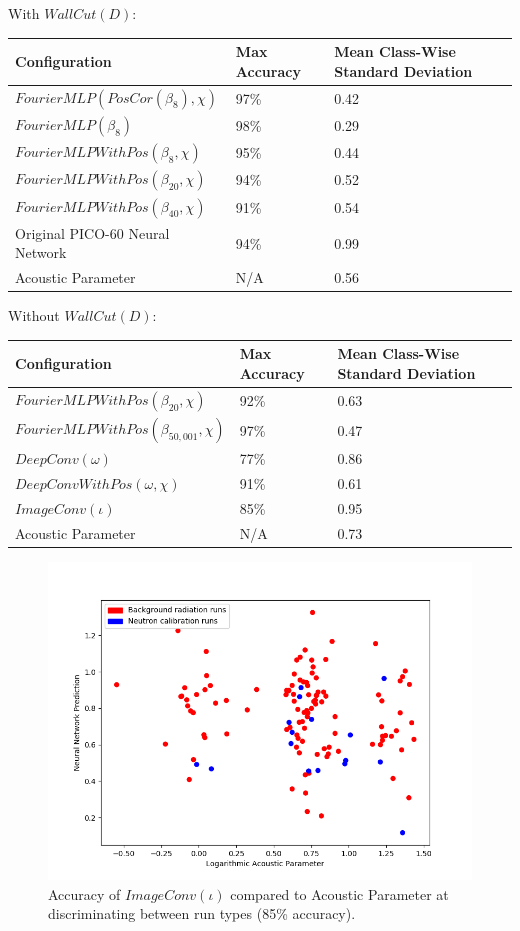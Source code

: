 \documentclass[10pt]{article}
\begin{document}
With $WallCut(D)$:

\begin{tabular}{|l|l|l|}
    \hline
    Configuration & Max Accuracy & Mean Class-Wise Standard Deviation \\
    \hline
    $FourierMLP(PosCor(\beta_{8}), \chi)$ & 97\% & 0.42 \\
    \hline
    $FourierMLP(\beta_{8})$ & 98\% & 0.29 \\
    \hline
    $FourierMLPWithPos(\beta_{8}, \chi)$ & 95\% & 0.44 \\
    \hline
    $FourierMLPWithPos(\beta_{20}, \chi)$ & 94\% & 0.52 \\
    \hline
    $FourierMLPWithPos(\beta_{40}, \chi)$ & 91\% & 0.54 \\
    \hline
    Original PICO-60 Neural Network & 94\% & 0.99 \\
    \hline
    Acoustic Parameter & N/A & 0.56 \\
    \hline
\end{tabular}

Without $WallCut(D)$:

\begin{tabular}{|l|l|l|}
    \hline
    Configuration & Max Accuracy & Mean Class-Wise Standard Deviation \\
    \hline
    $FourierMLPWithPos(\beta_{20}, \chi)$ & 92\% & 0.63 \\
    \hline
    $FourierMLPWithPos(\beta_{50,001}, \chi)$ & 97\% & 0.47 \\
    \hline
    $DeepConv(\omega)$ & 77\% & 0.86 \\
    \hline
    $DeepConvWithPos(\omega, \chi)$ & 91\% & 0.61 \\
    \hline
    $ImageConv(\iota)$ & 85\% & 0.95 \\
    \hline
    Acoustic Parameter & N/A & 0.73 \\
    \hline
\end{tabular}

\begin{figure}[H]
    \centering
    \includegraphics[width=\textwidth]{image_window}
    \caption{\label{image_window} Accuracy of $ImageConv(\iota)$ compared to Acoustic Parameter at discriminating between run types (85\% accuracy).}
\end{figure}
\end{document}

